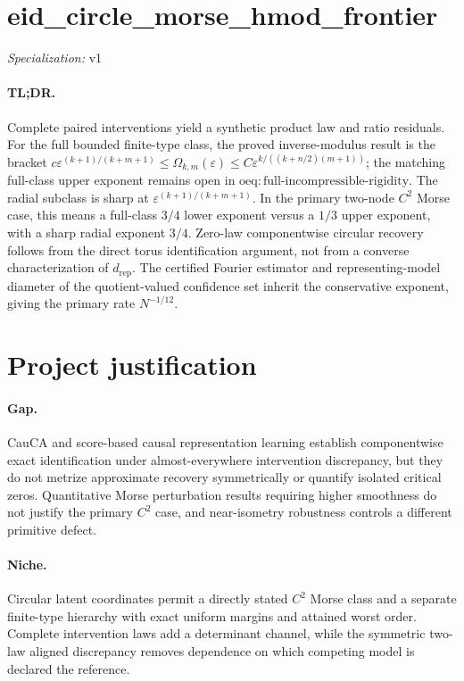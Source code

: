 \documentclass{article}
\begin{document}
\sloppy

\section*{eid\_\allowbreak{}circle\_\allowbreak{}morse\_\allowbreak{}hmod\_\allowbreak{}frontier}

\noindent\textit{Specialization:} v1\par

\paragraph{TL;DR.} Complete paired interventions yield a synthetic product law and ratio residuals. For the full bounded finite-type class, the proved inverse-modulus result is the bracket \(c\varepsilon^{(k+1)/(k+m+1)}\leq\Omega_{k,m}(\varepsilon)\leq C\varepsilon^{k/((k+n/2)(m+1))}\); the matching full-class upper exponent remains open in \(\mathrm{oeq:full\text{-}incompressible\text{-}rigidity}\). The radial subclass is sharp at \(\varepsilon^{(k+1)/(k+m+1)}\). In the primary two-node \(C^2\) Morse case, this means a full-class \(3/4\) lower exponent versus a \(1/3\) upper exponent, with a sharp radial exponent \(3/4\). Zero-law componentwise circular recovery follows from the direct torus identification argument, not from a converse characterization of \(d_{\mathrm{rep}}\). The certified Fourier estimator and representing-model diameter of the quotient-valued confidence set inherit the conservative exponent, giving the primary rate \(N^{-1/12}\).

\section{Project justification}

\paragraph{Gap.} CauCA and score-based causal representation learning establish componentwise exact identification under almost-everywhere intervention discrepancy, but they do not metrize approximate recovery symmetrically or quantify isolated critical zeros. Quantitative Morse perturbation results requiring higher smoothness do not justify the primary \(C^2\) case, and near-isometry robustness controls a different primitive defect.

\paragraph{Niche.} Circular latent coordinates permit a directly stated \(C^2\) Morse class and a separate finite-type hierarchy with exact uniform margins and attained worst order. Complete intervention laws add a determinant channel, while the symmetric two-law aligned discrepancy removes dependence on which competing model is declared the reference.
\end{document}
